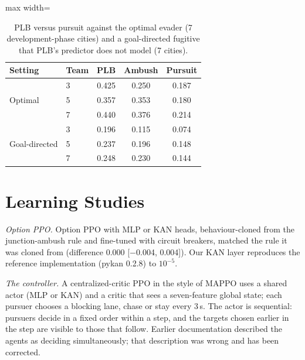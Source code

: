 \documentclass[preprint,12pt]{elsarticle}
\begin{document}
\begin{table}[!h]
\centering
\caption{PLB versus pursuit against the optimal evader (7 development-phase cities) and a goal-directed fugitive
that PLB's predictor does not model (7 cities).}
\label{tab:s-evaders}
\begin{adjustbox}{max width=\textwidth}
\begin{tabular}{@{}llccc@{}}
\toprule
Setting & Team & PLB & Ambush & Pursuit \\
\midrule
\multirow{3}{*}{Optimal} & 3 & 0.425 & 0.250 & 0.187 \\
& 5 & 0.357 & 0.353 & 0.180 \\
& 7 & 0.440 & 0.376 & 0.214 \\
\midrule
\multirow{3}{*}{Goal-directed} & 3 & 0.196 & 0.115 & 0.074 \\
& 5 & 0.237 & 0.196 & 0.148 \\
& 7 & 0.248 & 0.230 & 0.144 \\
\bottomrule
\end{tabular}
\end{adjustbox}
\end{table}

\section{Learning Studies}\label{sec:s-learning}

\emph{Option PPO.} Option PPO with MLP or KAN heads, behaviour-cloned from the junction-ambush rule and fine-tuned with
circuit breakers, matched the rule it was cloned from (difference $0.000$ [$-$0.004, 0.004]). Our KAN layer reproduces
the reference implementation (pykan 0.2.8) to $10^{-5}$.

\emph{The controller.} A centralized-critic PPO in the style of MAPPO uses a shared actor (MLP or KAN) and a critic
that sees a seven-feature global state; each pursuer chooses a blocking lane, chase or stay every 3\,s. The actor is
sequential: pursuers decide in a fixed order within a step, and the targets chosen earlier in the step are visible to
those that follow. Earlier documentation described the agents as deciding simultaneously; that description was wrong
and has been corrected.
\end{document}
